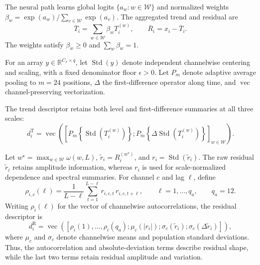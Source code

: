 \documentclass[pdflatex,sn-mathphys-num]{sn-jnl}
\newcommand{\1}{\mathbf{1}}
\theoremstyle{plain}
\begin{document}
	The neural path learns global logits $\{a_w:w\in\mathcal{W}\}$ and normalized weights $\beta_w=\exp(a_w)/\sum_{v\in\mathcal{W}}\exp(a_v)$. The aggregated trend and residual are
	\begin{equation}
		\overline{T}_i
		=
		\sum_{w\in\mathcal{W}}\beta_wT_i^{(w)},
		\qquad
		\overline{R}_i
		=
		x_i-\overline{T}_i.
		\label{eq:weighted}
	\end{equation}
	The weights satisfy $\beta_w\geq0$ and $\sum_w\beta_w=1$.
	
	For an array $y\in\mathbb{R}^{C_x\times q}$, let
	$\operatorname{Std}(y)$ denote independent channelwise centering and scaling,
	with a fixed denominator floor $\epsilon>0$. Let $P_m$ denote adaptive
	average pooling to $m=24$ positions, $\Delta$ the first-difference
	operator along time, and $\operatorname{vec}$ channel-preserving
	vectorization.
	
	The trend descriptor retains both level and first-difference summaries
	at all three scales:
	\begin{equation}
		d_i^{\mathrm{T}}
		=
		\operatorname{vec}\!\left(
		\left[
		P_m\!\left\{\operatorname{Std}\!\left(T_i^{(w)}\right)\right\};
		P_m\!\left\{\Delta\operatorname{Std}\!\left(T_i^{(w)}\right)\right\}
		\right]_{w\in\mathcal{W}}
		\right).
		\label{eq:trenddesc}
	\end{equation}
	
	Let $w^\star=\max_{w\in\mathcal{W}}\omega(w,L)$, $\widetilde r_i=R_i^{(w^\star)}$, and $r_i=\operatorname{Std}(\widetilde r_i)$.
	The raw residual $\widetilde r_i$ retains amplitude information, whereas
	$r_i$ is used for scale-normalized dependence and spectral summaries.
	For channel $c$ and lag $\ell$, define
	\begin{equation}
		\rho_{i,c}(\ell)
		=
		\frac{1}{L-\ell}
		\sum_{t=1}^{L-\ell}
		r_{i,c,t}\,r_{i,c,t+\ell},
		\qquad
		\ell=1,\ldots,q_a,
		\qquad
		q_a=12.
		\label{eq:acf}
	\end{equation}
	Writing $\rho_i(\ell)$ for the vector of channelwise autocorrelations,
	the residual descriptor is
	\begin{equation}
		d_i^{\mathrm{R}}
		=
		\operatorname{vec}\!\left(
		\left[
		\rho_i(1),\ldots,\rho_i(q_a);
		\mu_c(|r_i|);
		\sigma_c(\widetilde r_i);
		\sigma_c(\Delta\widetilde r_i)
		\right]
		\right),
		\label{eq:resdesc}
	\end{equation}
	where $\mu_c$ and $\sigma_c$ denote channelwise means and population
	standard deviations. Thus, the autocorrelation and absolute-deviation
	terms describe residual shape, while the last two terms retain residual
	amplitude and variation.
	
\end{document}
